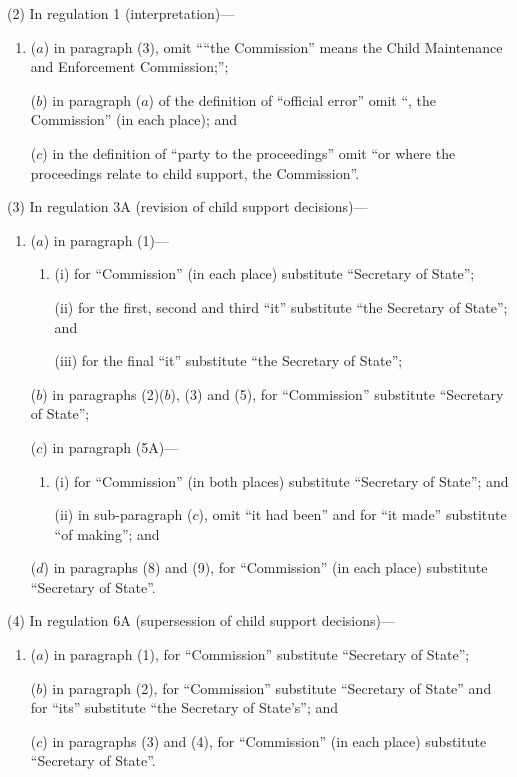 \documentclass[12pt,a4paper]{article}
\begin{document}
(2) In regulation 1 (interpretation)—
\begin{enumerate}\item[]
($a$) in paragraph (3), omit ““the Commission” means the Child Maintenance and Enforcement Commission;”;

($b$) in paragraph ($a$)  of the definition of “official error” omit “, the Commission” (in each place); and

($c$) in the definition of “party to the proceedings” omit “or where the proceedings relate to child support, the Commission”.
\end{enumerate}

(3) In regulation 3A (revision of child support decisions)—
\begin{enumerate}\item[]
($a$) in paragraph (1)—
\begin{enumerate}\item[]
(i)  for “Commission” (in each place) substitute “Secretary of State”;

(ii) for the first, second and third “it” substitute “the Secretary of State”; and

(iii) for the final “it” substitute “the Secretary of State”;
\end{enumerate}

($b$) in paragraphs (2)($b$), (3) and (5), for “Commission” substitute “Secretary of State”;

($c$) in paragraph (5A)—
\begin{enumerate}\item[]
(i)  for “Commission” (in both places) substitute “Secretary of State”; and

(ii) in sub-paragraph ($c$), omit “it had been” and for “it made” substitute “of making”; and
\end{enumerate}

($d$) in paragraphs (8) and (9), for “Commission” (in each place) substitute “Secretary of State”.
\end{enumerate}

(4) In regulation 6A (supersession of child support decisions)—
\begin{enumerate}\item[]
($a$) in paragraph (1), for “Commission” substitute “Secretary of State”;

($b$) in paragraph (2), for “Commission” substitute “Secretary of State” and for “its” substitute “the Secretary of State’s”; and

($c$) in paragraphs (3) and (4), for “Commission” (in each place) substitute “Secretary of State”.
\end{enumerate}
\end{document}
